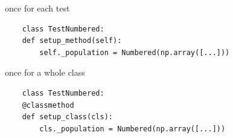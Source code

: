 once for each test
\begin{verbatim}
    class TestNumbered:
    def setup_method(self):
        self._population = Numbered(np.array([...]))
\end{verbatim}

once for a whole class
\begin{verbatim}
    class TestNumbered:
    @classmethod
    def setup_class(cls):
        cls._population = Numbered(np.array([...]))
\end{verbatim}
